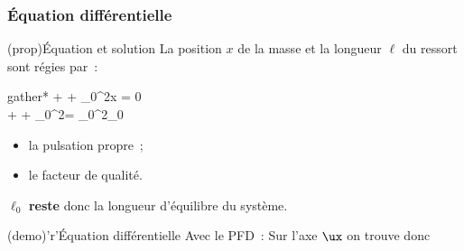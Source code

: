 \documentclass[../../main/main.tex]{subfiles}
\begin{document}
\begin{tcb}[label=def:ressortlibre, sidebyside]
\begin{center}
{		}
	\end{center}
	\begin{itemize}[label=$\diamond$, leftmargin=10pt]
		\psw{
			\[
				\begin{array}{ll}
					\textbf{Poids}               & \Pf = m\gf = -mg \uy         \\
					\textbf{Réaction normale}    & \Rf = R\uy                   \\
					\textbf{Force de rappel}     & \Ff = -kx (t)\ux             \\
					\textbf{Force de frottement} & \Ff_{\rm frott} = -\alpha\vf
				\end{array}
			\]
		}
	\end{itemize}
\end{tcb}

\subsubsection{Équation différentielle}

\begin{tcbraster}[raster columns=2, raster equal height=rows]
	\begin{tcb}[label=prop:eqdiffreslibre](prop){Équation et solution}
		La position $x$ de la masse et la longueur $\ell$ du ressort sont régies
		par~:

		\begin{empheq}[box=\fbox]{gather*}
			 +   + \w_0{}^2x = 0\\
			\Lra {} +
			  + \w_0{}^2\ell = \w_0{}^2\ell_0
		\end{empheq}
		\begin{itemize}
			\item {} la pulsation propre~;
			\item {} le facteur de qualité.
		\end{itemize}
		$\ell_0$ \textbf{reste} donc la longueur d'équilibre du système.
	\end{tcb}
	\begin{tcb}[label=demo:solreslibre](demo)'r'{Équation différentielle}
		Avec le PFD~:
		Sur l'axe $\ux$ on trouve donc
		\psw{
			\[
				m \dv[2]{x}{t} + \alpha \dv{x}{t} + kx = 0
			\]
		}
		\vspace{-15pt}
	\end{tcb}
\end{tcbraster}
\end{document}
